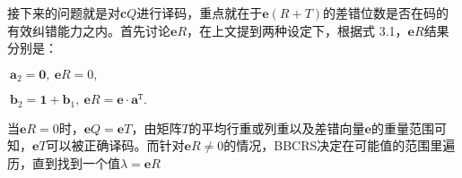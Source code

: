 \begin{breakablealgorithm}
\begin{algorithmic}
		接下来的问题就是对$\mathbf{c}Q$进行译码，重点就在于$\mathbf{e}(R + T)$的差错位数是否在码的有效纠错能力之内。首先讨论$\mathbf{e}R$，在上文提到两种设定下，根据式 3.1，$\mathbf{e}R$结果分别是：
		\begin{center}
			$~\mathbf{a}_2 = \mathbf{0},~\mathbf{e}R = 0,$
			
			$~\mathbf{b}_2=\mathbf{1} + \mathbf{b}_1,~\mathbf{e}R = \mathbf{e} \cdot \mathbf{a}^\mathtt{T}.$
		\end{center}
		当$\mathbf{e}R = 0$时，$\mathbf{e}Q = \mathbf{e}T$，由矩阵$T$的平均行重或列重以及差错向量$\mathbf{e}$的重量范围可知，$\mathbf{e}T$可以被正确译码。而针对$\mathbf{e}R \neq 0$的情况，BBCRS决定在可能值的范围里遍历，直到找到一个值$\lambda = \mathbf{e}R$
	\end{algorithmic}
\end{breakablealgorithm}


